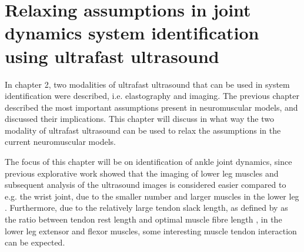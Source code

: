 
\chapter{Relaxing assumptions in joint dynamics system identification using ultrafast ultrasound}
\label{chap:remove_assumptions}

In chapter 2, two modalities of ultrafast ultrasound that can be used in system identification were described, i.e. elastography and imaging. The previous chapter described the most important assumptions present in neuromuscular models, and discussed their implications.  This chapter will discuss in what way the two modality of ultrafast ultrasound can be used to relax the assumptions in the current neuromuscular models.

The focus of this chapter will be on identification of ankle joint dynamics, since previous explorative work showed that the imaging of lower leg muscles and subsequent analysis of the ultrasound images is considered easier compared to e.g. the wrist joint, due to the smaller number and larger muscles in the lower leg \cite{ossenkoppele_ultrasound_2017}. Furthermore, due to the relatively large tendon slack length, as defined by \citeauthor{zajac_muscle_1989} as the ratio between tendon rest length and optimal muscle fibre length \cite{zajac_muscle_1989}, in the lower leg extensor and flexor muscles, some interesting muscle tendon interaction can be expected. 



